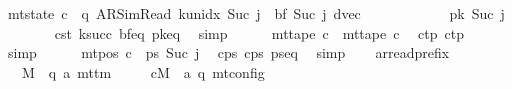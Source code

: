 \begin{isabellebody}
\ {\isachardoublequoteopen}mt{\isacharunderscore}{\kern0pt}state\ c{\isacharprime}{\kern0pt}\ {\isacharequal}{\kern0pt}\ {\isacharparenleft}{\kern0pt}q{\isacharcomma}{\kern0pt}\ AR{\isacharunderscore}{\kern0pt}SimRead{\isacharcomma}{\kern0pt}\ k{\isacharunderscore}{\kern0pt}unidx\ {\isacharparenleft}{\kern0pt}Suc\ j{\isacharparenright}{\kern0pt}{\isacharcomma}{\kern0pt}\ {}{\isacharcomma}{\kern0pt}\ {\isacharquery}{\kern0pt}bf\ {\isacharparenleft}{\kern0pt}Suc\ j{\isacharparenright}{\kern0pt}{\isacharcomma}{\kern0pt}\ dvec{\isacharcomma}{\kern0pt}\isanewline
\ \ \ \ \ \ \ \ \ \ \ \ {\isacharquery}{\kern0pt}pk\ {\isacharparenleft}{\kern0pt}Suc\ j{\isacharparenright}{\kern0pt}{\isacharparenright}{\kern0pt}{\isachardoublequoteclose}\isanewline
\ \ \ \ \ \ \isamarkupfalse%
\ c{\isacharprime}{\kern0pt}{\isacharunderscore}{\kern0pt}st\ ksucc\ bf{\isacharunderscore}{\kern0pt}eq\ pk{\isacharunderscore}{\kern0pt}eq\ \isamarkupfalse%
\ simp\isanewline
\ \ \ \ \isamarkupfalse%
\ {\isachardoublequoteopen}mt{\isacharunderscore}{\kern0pt}tape\ c{\isacharprime}{\kern0pt}\ {\isacharequal}{\kern0pt}\ mt{\isacharunderscore}{\kern0pt}tape\ c{}{\isachardoublequoteclose}\ \isamarkupfalse%
\ c{\isacharprime}{\kern0pt}{\isacharunderscore}{\kern0pt}tp\ c{\isacharunderscore}{\kern0pt}tp\ \isamarkupfalse%
\ simp\isanewline
\ \ \ \ \isamarkupfalse%
\ {\isachardoublequoteopen}mt{\isacharunderscore}{\kern0pt}pos\ c{\isacharprime}{\kern0pt}\ {\isacharequal}{\kern0pt}\ {\isacharquery}{\kern0pt}ps\ {\isacharparenleft}{\kern0pt}Suc\ j{\isacharparenright}{\kern0pt}{\isachardoublequoteclose}\ \isamarkupfalse%
\ c{\isacharprime}{\kern0pt}{\isacharunderscore}{\kern0pt}ps\ c{\isacharunderscore}{\kern0pt}ps\ ps{\isacharunderscore}{\kern0pt}eq\ \isamarkupfalse%
\ simp\isanewline
\ \ \isamarkupfalse%
\isanewline
{}\isamarkupfalse%
%
\endisatagproof
{\isafoldproof}%
%
\isadelimproof
\isanewline
%
\endisadelimproof
\isanewline
{}\isamarkupfalse%
\ ar{\isacharunderscore}{\kern0pt}read{\isacharunderscore}{\kern0pt}prefix{\isacharcolon}{\kern0pt}\isanewline
\ \ \ M\ {\isacharcolon}{\kern0pt}{\isacharcolon}{\kern0pt}\ {\isachardoublequoteopen}{\isacharparenleft}{\kern0pt}{\isacharprime}{\kern0pt}q{\isacharcomma}{\kern0pt}\ {\isacharprime}{\kern0pt}a{\isacharparenright}{\kern0pt}\ mttm{\isachardoublequoteclose}\isanewline
\ \ \ \ \ cM\ {\isacharcolon}{\kern0pt}{\isacharcolon}{\kern0pt}\ {\isachardoublequoteopen}{\isacharparenleft}{\kern0pt}{\isacharprime}{\kern0pt}a{\isacharcomma}{\kern0pt}\ {\isacharprime}{\kern0pt}q{\isacharparenright}{\kern0pt}\ mt{\isacharunderscore}{\kern0pt}config{\isachardoublequoteclose}\isanewline

\end{isabellebody}
